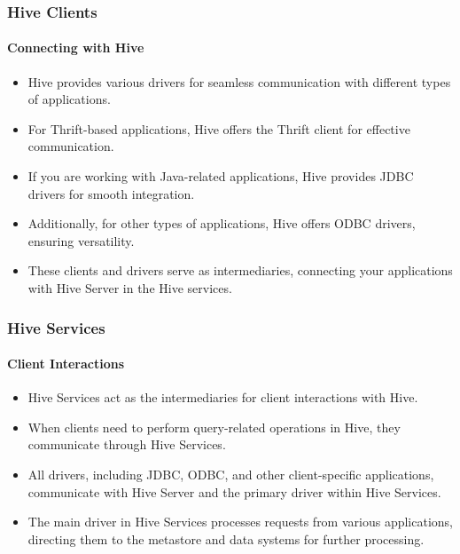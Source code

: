 \begin{frame}
\frametitle{Hive Clients}
	\framesubtitle{Connecting with Hive}
	
	\begin{itemize}
	  \item Hive provides various drivers for seamless communication with different types of applications.
	  \item For Thrift-based applications, Hive offers the Thrift client for effective communication.
	  \item If you are working with Java-related applications, Hive provides JDBC drivers for smooth integration.
	  \item Additionally, for other types of applications, Hive offers ODBC drivers, ensuring versatility.
	  \item These clients and drivers serve as intermediaries, connecting your applications with Hive Server in the Hive services.
	\end{itemize}
	
	\end{frame}
\begin{frame}
	\frametitle{Hive Services}
	\framesubtitle{Client Interactions}
	
	\begin{itemize}
	  \item Hive Services act as the intermediaries for client interactions with Hive.
	  \item When clients need to perform query-related operations in Hive, they communicate through Hive Services.
	  \item All drivers, including JDBC, ODBC, and other client-specific applications, communicate with Hive Server and the primary driver within Hive Services.
	  \item The main driver in Hive Services processes requests from various applications, directing them to the metastore and data systems for further processing.
	\end{itemize}
	
	\end{frame}

